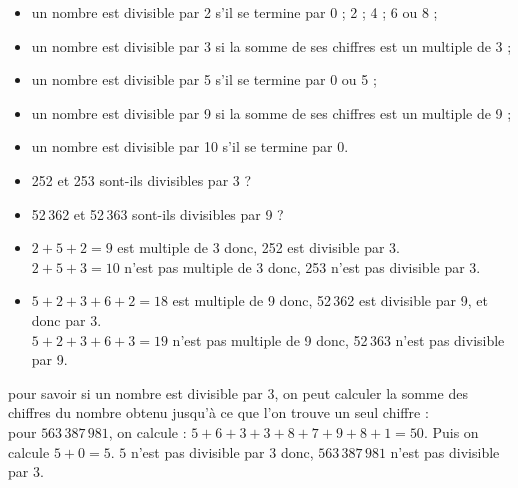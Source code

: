 \begin{propriete}
   \begin{itemize}
      \item un nombre est divisible par 2 s'il se termine par 0 ; 2 ; 4 ; 6 ou 8 ;
      \item un nombre est divisible par 3 si la somme de ses chiffres est un multiple de 3 ;
      \item un nombre est divisible par 5 s'il se termine par 0 ou 5 ;
      \item un nombre est divisible par 9 si la somme de ses chiffres est un multiple de 9 ;
      \item un nombre est divisible par 10 s'il se termine par 0.
   \end{itemize}
   \vspace*{-3mm}
\end{propriete}

\begin{exemple*1}
   \begin{itemize}
      \item 252 et 253 sont-ils divisibles par 3 ?
      \item 52\,362 et 52\,363 sont-ils divisibles par 9 ?
    \end{itemize}   
   \correction
      \begin{itemize}
         \item $2+5+2=9$ est multiple de 3 donc, 252 est divisible par 3. \\
            $2+5+3=10$ n'est pas multiple de 3 donc, 253 n'est pas divisible par 3.
         \item $5+2+3+6+2=18$ est multiple de 9 donc, 52\,362 est divisible par 9, et donc par 3. \\
            $5+2+3+6+3=19$ n'est pas multiple de 9 donc, 52\,363 n'est pas divisible par 9.
       \end{itemize}
    \vspace*{-3mm}
\end{exemple*1}

\begin{remarque}
   pour savoir si un nombre est divisible par $3$, on peut calculer la somme des chiffres du nombre obtenu jusqu'à ce que l'on trouve un seul chiffre : \\
   pour $563\,387\,981$, on calcule : $5+6+3+3+8+7+9+8+1=50$. Puis on calcule $5+0=5$.
   $5$ n'est pas divisible par $3$ donc, $563\,387\,981$ n'est pas divisible par $3$.
\end{remarque}


